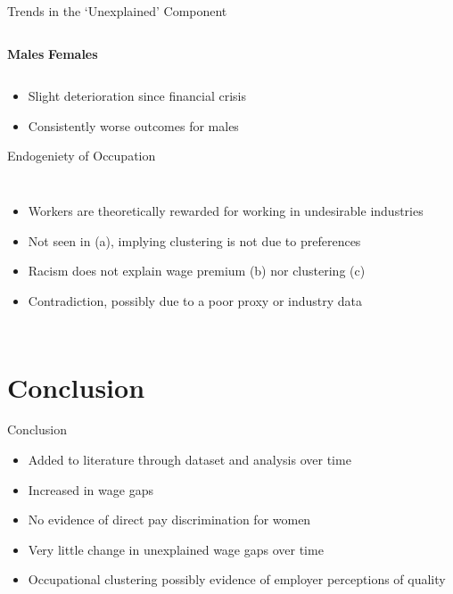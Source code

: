 \documentclass[aspectratio=169,12pt]{beamer}
\begin{document}
\begin{frame}{Trends in the \enquote*{Unexplained} Component}
    \begin{columns}
        \vspace{5pt}
        \textbf{Males}
	    \vspace{-2pt}
	    \textbf{Females}
	\end{columns}
	\begin{itemize}
	    \item Slight deterioration since financial crisis
	    \item Consistently worse outcomes for males
	\end{itemize}
\end{frame}

\begin{frame}{Endogeniety of Occupation}
    \begin{columns}
	    \hspace{-20pt}
	    \begin{itemize}
	    \vspace{-20pt}
	    \item Workers are theoretically rewarded for working in undesirable industries
	    \item Not seen in (a), implying clustering is not due to preferences
	    \item Racism does not explain wage premium (b) nor clustering (c)
	    \item Contradiction, possibly due to a poor proxy or industry data
	    \end{itemize}
	\end{columns}
	
\end{frame}

\section{Conclusion}
\begin{frame}{Conclusion}
	 \begin{itemize}
	    \vspace{-20pt}
	    \item Added to literature through dataset and analysis over time
	    \item Increased in wage gaps
	    \item No evidence of direct pay discrimination for women
	    \item Very little change in unexplained wage gaps over time
	    \item Occupational clustering possibly evidence of employer perceptions of quality
	 \end{itemize}
\end{frame}
\end{document}
